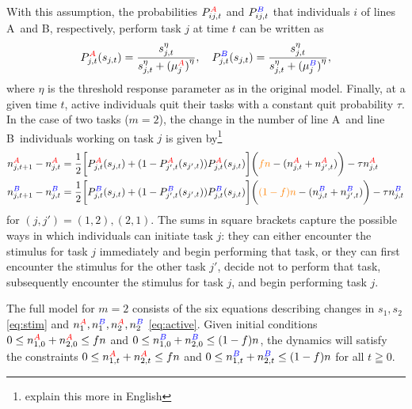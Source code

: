 \documentclass[10pt]{article}
\newcommand{\A}{{\color{red}A}}
\newcommand{\B}{{\color{blue}B}}
\begin{document}
With this assumption, the probabilities $P_{ij,t}^{\A}$ and $P_{ij,t}^{\B}$ that individuals $i$ of lines \A\ and \B, respectively, perform task $j$ at time $t$ can be written as
\begin{equation}
    P_{j,t}^{\A} (s_{j,t}) = \frac{s_{j,t}^\eta}{s_{j,t}^\eta + {(\mu_j^{\A})}^\eta}, \quad P_{j,t}^{\B} (s_{j,t}) = \frac{s_{j,t}^\eta}{s_{j,t}^\eta +{(\mu_j^{\B})}^\eta},
\end{equation}
where $\eta$ is the threshold response parameter as in the original model. Finally, at a given time $t$, active individuals quit their tasks with a constant quit probability $\tau$. In the case of two tasks ($m = 2$), the change in the number of line \A\ and line \B\ individuals working on task $j$ is given by\footnote{explain this more in English}
\begin{align}
    n_{j,t+1}^{\A} - n_{j,t}^{\A} & = \frac{1}{2} \bigg[ P_{j,t}^{\A}(s_{j,t}) + (1 - P_{j',t}^{\A}(s_{j',t}))P_{j,t}^{\A}(s_{j,t})\bigg] \bigg( {\color{orange}fn}
 - (n_{j,t}^{\A} + n_{j',t}^{\A}) \bigg) - \tau n_{j,t}^{\A} \nonumber\\
    n_{j,t+1}^{\B} - n_{j,t}^{\B} & = \frac{1}{2} \bigg[ P_{j,t}^{\B}(s_{j,t}) + (1 - P_{j',t}^{\B}(s_{j',t}))P_{j,t}^{\B}(s_{j,t})\bigg] \bigg( {\color{orange}(1-f)n} - (n_{j,t}^{\B} + n_{j',t}^{\B}) \bigg) - \tau n_{j,t}^{\B} \label{eq:active}
\end{align}
for $(j,j')=(1,2), (2,1)$. {\color{black}The sums in square brackets capture the possible ways in which individuals can initiate task $j$: they can either encounter the stimulus for task $j$ immediately and begin performing that task, or they can first encounter the stimulus for the other task $j'$, decide not to perform that task, subsequently encounter the stimulus for task $j$, and begin performing task $j$.}

The full model for $m=2$ consists of the six equations describing changes in $s_1, s_2$ \eqref{eq:stim} and $ n_1^{\A}, n_1^{\B}, n_2^{\A}, n_2^{\B}$ \eqref{eq:active}. Given initial conditions 
$0\leq n_{1,0}^{\A}+n_{2,0}^{\A} \leq fn$ and $0\leq n_{1,0}^{\B}+ n_{2,0}^{\B} \leq (1-f)n$,
the dynamics will satisfy the constraints $0\leq n_{1,t}^{\A}+n_{2,t}^{\A} \leq fn$ and $0\leq n_{1,t}^{\B}+ n_{2,t}^{\B} \leq (1-f)n$ for all $t \geqq 0$.
\end{document}
